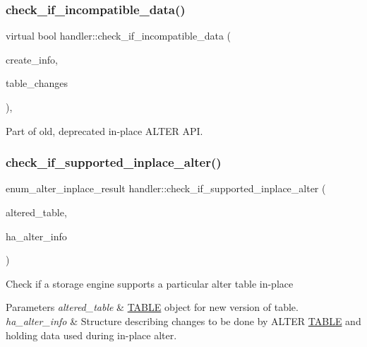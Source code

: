\subsubsection{\texorpdfstring{check\+\_\+if\+\_\+incompatible\+\_\+data()}{check\_if\_incompatible\_data()}}
{\footnotesize\ttfamily virtual bool handler\+::check\+\_\+if\+\_\+incompatible\+\_\+data (\begin{DoxyParamCaption}\item[{\mbox{\hyperlink{structst__ha__create__information}{H\+A\+\_\+\+C\+R\+E\+A\+T\+E\+\_\+\+I\+N\+FO}} $\ast$}]{create\+\_\+info,  }\item[{uint}]{table\+\_\+changes }\end{DoxyParamCaption})\hspace{0.3cm}{\ttfamily [inline]}, {\ttfamily [virtual]}}

Part of old, deprecated in-\/place A\+L\+T\+ER A\+PI. \mbox{\label{classhandler_a67890a9deb89b9ef0128601e7687fcba}} 
\subsubsection{\texorpdfstring{check\+\_\+if\+\_\+supported\+\_\+inplace\+\_\+alter()}{check\_if\_supported\_inplace\_alter()}}
{\footnotesize\ttfamily enum\+\_\+alter\+\_\+inplace\+\_\+result handler\+::check\+\_\+if\+\_\+supported\+\_\+inplace\+\_\+alter (\begin{DoxyParamCaption}\item[{\mbox{\hyperlink{structTABLE}{T\+A\+B\+LE}} $\ast$}]{altered\+\_\+table,  }\item[{\mbox{\hyperlink{classAlter__inplace__info}{Alter\+\_\+inplace\+\_\+info}} $\ast$}]{ha\+\_\+alter\+\_\+info }\end{DoxyParamCaption})\hspace{0.3cm}{\ttfamily [virtual]}}

Check if a storage engine supports a particular alter table in-\/place


\begin{DoxyParams}{Parameters}
{\em altered\+\_\+table} & \mbox{\hyperlink{structTABLE}{T\+A\+B\+LE}} object for new version of table. \\
\hline
{\em ha\+\_\+alter\+\_\+info} & Structure describing changes to be done by A\+L\+T\+ER \mbox{\hyperlink{structTABLE}{T\+A\+B\+LE}} and holding data used during in-\/place alter.\\
\hline
\end{DoxyParams}

